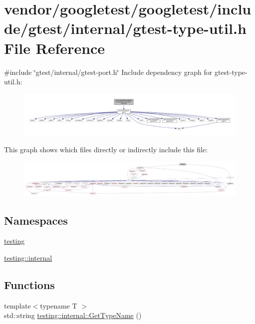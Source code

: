 \hypertarget{gtest-type-util_8h}{}\section{vendor/googletest/googletest/include/gtest/internal/gtest-\/type-\/util.h File Reference}
\label{gtest-type-util_8h}
{\ttfamily \#include \char`\"{}gtest/internal/gtest-\/port.\+h\char`\"{}}\newline
Include dependency graph for gtest-\/type-\/util.h\+:
\nopagebreak
\begin{figure}[H]
\begin{center}
\leavevmode
\includegraphics[width=350pt]{gtest-type-util_8h__incl}
\end{center}
\end{figure}
This graph shows which files directly or indirectly include this file\+:
\nopagebreak
\begin{figure}[H]
\begin{center}
\leavevmode
\includegraphics[width=350pt]{gtest-type-util_8h__dep__incl}
\end{center}
\end{figure}
\subsection*{Namespaces}
\begin{DoxyCompactItemize}
\item 
 \hyperlink{namespacetesting}{testing}
\item 
 \hyperlink{namespacetesting_1_1internal}{testing\+::internal}
\end{DoxyCompactItemize}
\subsection*{Functions}
\begin{DoxyCompactItemize}
\item 
{\footnotesize template$<$typename T $>$ }\\std\+::string \hyperlink{namespacetesting_1_1internal_a635606b4731f843c86ec8ca51cab83a1}{testing\+::internal\+::\+Get\+Type\+Name} ()
\end{DoxyCompactItemize}
